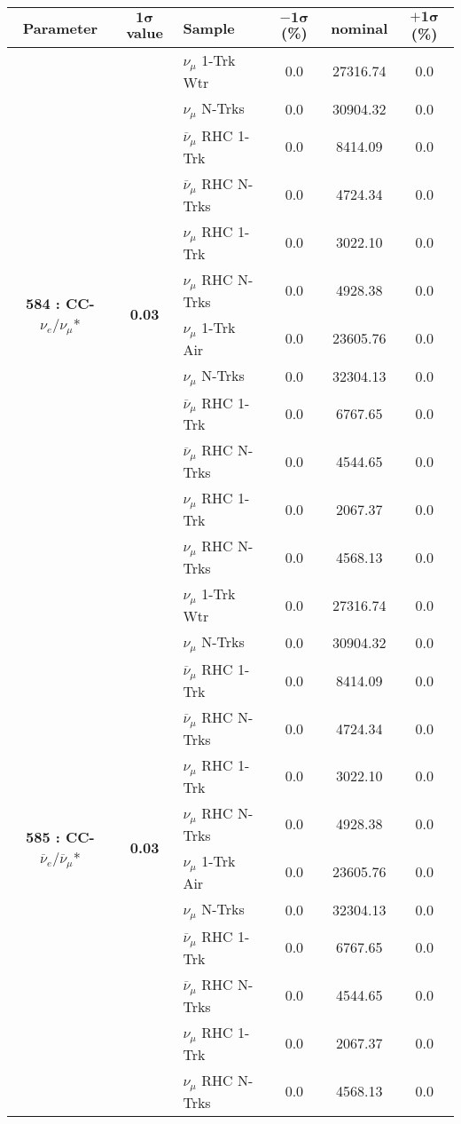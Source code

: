 \addtocounter{table}{-1}
\begin{table}[ht!]
\centering

\begin{tabular}{ c  c  l  c  c  c }
\midrule[1.3pt]
\textbf{Parameter} & \textbf{$\mathbf{1\sigma}$ value} & \textbf{Sample} & \textbf{$\mathbf{-1\sigma}$ (\%)}  &  \textbf{nominal}  &  \textbf{$\mathbf{+1\sigma}$ (\%)} \\
\midrule[1.3pt]
\multirow{12}{*}{\textbf{584 : CC-}$\nu_e/\nu_\mu$*} & \multirow{12}{*}{\textbf{0.03}} & $\nu_\mu$ 1-Trk Wtr &   0.0 &  27316.74 &   0.0 \\ 
 &  & $\nu_\mu$ N-Trks &   0.0 &  30904.32 &   0.0 \\ 
 &  & $\overline{\nu}_\mu$ RHC 1-Trk &   0.0 &  8414.09 &   0.0 \\ 
 &  & $\overline{\nu}_\mu$ RHC N-Trks &   0.0 &  4724.34 &   0.0 \\ 
 &  & $\nu_\mu$ RHC 1-Trk &   0.0 &  3022.10 &   0.0 \\ 
 &  & $\nu_\mu$ RHC N-Trks &   0.0 &  4928.38 &   0.0 \\ 
 &  & $\nu_\mu$ 1-Trk Air &   0.0 &  23605.76 &   0.0 \\ 
 &  & $\nu_\mu$ N-Trks &   0.0 &  32304.13 &   0.0 \\ 
 &  & $\overline{\nu}_\mu$ RHC 1-Trk &   0.0 &  6767.65 &   0.0 \\ 
 &  & $\overline{\nu}_\mu$ RHC N-Trks &   0.0 &  4544.65 &   0.0 \\ 
 &  & $\nu_\mu$ RHC 1-Trk &   0.0 &  2067.37 &   0.0 \\ 
 &  & $\nu_\mu$ RHC N-Trks &   0.0 &  4568.13 &   0.0 \\ 
\midrule[1.3pt]
\multirow{12}{*}{\textbf{585 : CC-}$\overline{\nu}_e/\overline{\nu}_\mu$*} & \multirow{12}{*}{\textbf{0.03}} & $\nu_\mu$ 1-Trk Wtr &   0.0 &  27316.74 &   0.0 \\ 
 &  & $\nu_\mu$ N-Trks &   0.0 &  30904.32 &   0.0 \\ 
 &  & $\overline{\nu}_\mu$ RHC 1-Trk &   0.0 &  8414.09 &   0.0 \\ 
 &  & $\overline{\nu}_\mu$ RHC N-Trks &   0.0 &  4724.34 &   0.0 \\ 
 &  & $\nu_\mu$ RHC 1-Trk &   0.0 &  3022.10 &   0.0 \\ 
 &  & $\nu_\mu$ RHC N-Trks &   0.0 &  4928.38 &   0.0 \\ 
 &  & $\nu_\mu$ 1-Trk Air &   0.0 &  23605.76 &   0.0 \\ 
 &  & $\nu_\mu$ N-Trks &   0.0 &  32304.13 &   0.0 \\ 
 &  & $\overline{\nu}_\mu$ RHC 1-Trk &   0.0 &  6767.65 &   0.0 \\ 
 &  & $\overline{\nu}_\mu$ RHC N-Trks &   0.0 &  4544.65 &   0.0 \\ 
 &  & $\nu_\mu$ RHC 1-Trk &   0.0 &  2067.37 &   0.0 \\ 
 &  & $\nu_\mu$ RHC N-Trks &   0.0 &  4568.13 &   0.0 \\ 
\midrule[1.3pt]
\end{tabular}
\end{table}
